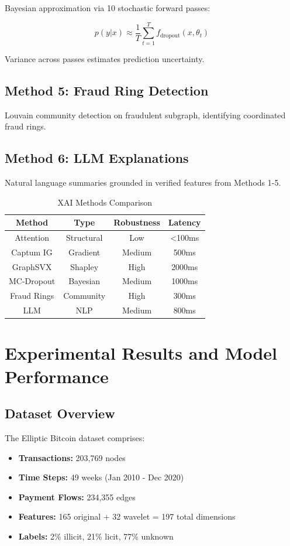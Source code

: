 \documentclass[10pt,conference,compsociety]{IEEEtran}
\begin{document}
Bayesian approximation via 10 stochastic forward passes:

\[
p(y | x) \approx \frac{1}{T} \sum_{t=1}^{T} f_{\text{dropout}}(x, \theta_t)
\]

Variance across passes estimates prediction uncertainty.

\subsection{Method 5: Fraud Ring Detection}

Louvain community detection on fraudulent subgraph, identifying coordinated fraud rings.

\subsection{Method 6: LLM Explanations}

Natural language summaries grounded in verified features from Methods 1-5.

\begin{table}[!h]
\centering
\caption{XAI Methods Comparison}
\begin{tabular}{|c|c|c|c|}
\hline
\textbf{Method} & \textbf{Type} & \textbf{Robustness} & \textbf{Latency} \\
\hline
Attention & Structural & Low & <100ms \\
Captum IG & Gradient & Medium & 500ms \\
GraphSVX & Shapley & High & 2000ms \\
MC-Dropout & Bayesian & Medium & 1000ms \\
Fraud Rings & Community & High & 300ms \\
LLM & NLP & Medium & 800ms \\
\hline
\end{tabular}
\end{table}

\section{Experimental Results and Model Performance}

\subsection{Dataset Overview}

The Elliptic Bitcoin dataset \cite{ref9} comprises:
\begin{itemize}
    \item \textbf{Transactions:} 203,769 nodes
    \item \textbf{Time Steps:} 49 weeks (Jan 2010 - Dec 2020)
    \item \textbf{Payment Flows:} 234,355 edges
    \item \textbf{Features:} 165 original + 32 wavelet = 197 total dimensions
    \item \textbf{Labels:} 2\% illicit, 21\% licit, 77\% unknown
\end{itemize}
\end{document}
